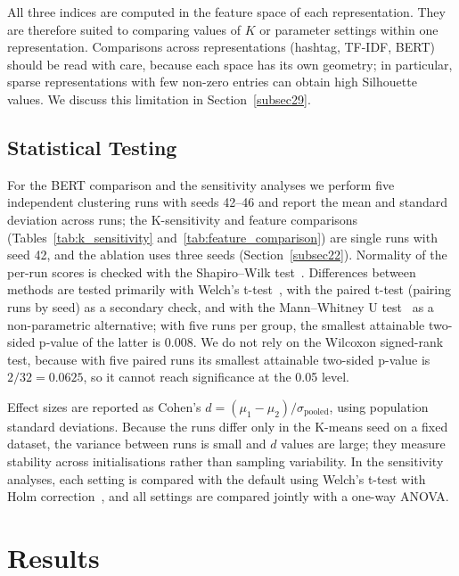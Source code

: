 \documentclass[pdflatex,sn-mathphys-num]{sn-jnl}%
\begin{document}
All three indices are computed in the feature space of each representation. They are therefore suited to comparing values of $K$ or parameter settings within one representation. Comparisons across representations (hashtag, TF-IDF, BERT) should be read with care, because each space has its own geometry; in particular, sparse representations with few non-zero entries can obtain high Silhouette values. We discuss this limitation in Section~\ref{subsec29}.

\subsection{Statistical Testing}\label{subsec18}

For the BERT comparison and the sensitivity analyses we perform five independent clustering runs with seeds 42--46 and report the mean and standard deviation across runs; the K-sensitivity and feature comparisons (Tables~\ref{tab:k_sensitivity} and~\ref{tab:feature_comparison}) are single runs with seed 42, and the ablation uses three seeds (Section~\ref{subsec22}). Normality of the per-run scores is checked with the Shapiro--Wilk test~\cite{shapiro1965}. Differences between methods are tested primarily with Welch's t-test~\cite{welch1947}, with the paired t-test (pairing runs by seed) as a secondary check, and with the Mann--Whitney U test~\cite{mann1947} as a non-parametric alternative; with five runs per group, the smallest attainable two-sided p-value of the latter is 0.008. We do not rely on the Wilcoxon signed-rank test, because with five paired runs its smallest attainable two-sided p-value is $2/32 = 0.0625$, so it cannot reach significance at the 0.05 level.

Effect sizes are reported as Cohen's $d = (\mu_1 - \mu_2)/\sigma_{\text{pooled}}$, using population standard deviations. Because the runs differ only in the K-means seed on a fixed dataset, the variance between runs is small and $d$ values are large; they measure stability across initialisations rather than sampling variability. In the sensitivity analyses, each setting is compared with the default using Welch's t-test with Holm correction~\cite{holm1979}, and all settings are compared jointly with a one-way ANOVA.


\section{Results}\label{sec5}
\end{document}
